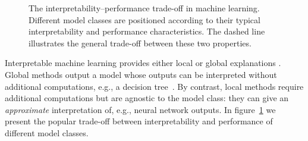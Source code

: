 \begin{figure}
    \centering
    \caption{The interpretability–performance trade-off in machine learning. Different model classes are positioned according to their typical interpretability and performance characteristics. The dashed line illustrates the general trade-off between these two properties.}
    \label{fig:interpretability-performance-tradeoff}
\end{figure}
Interpretable machine learning provides either local or global explanations \cite{glanois-survey}.
Global methods output a model whose outputs can be interpreted without additional computations, e.g., a decision tree~\cite{breiman1984classification}. By contrast, local methods require additional computations but are agnostic to the model class: they can give an \textit{approximate} interpretation of, e.g., neural network outputs.
In figure~\ref{fig:interpretability-performance-tradeoff} we present the popular trade-off between interpretability and performance of different model classes.

